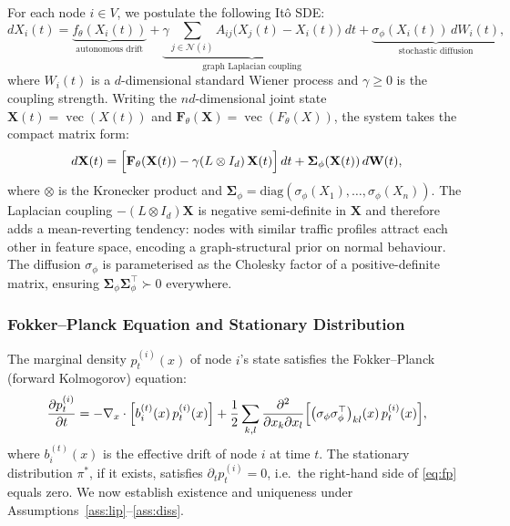 For each node $i \in V$, we postulate the following It\^o SDE:
\begin{equation}\label{eq:sde}
dX_i(t) = \underbrace{f_\theta(X_i(t))}_{\text{autonomous drift}}
         + \underbrace{\gamma \sum_{j \in \mathcal{N}(i)}
           A_{ij}\bigl(X_j(t) - X_i(t)\bigr)}_{\text{graph Laplacian coupling}}\; dt
         + \underbrace{\sigma_\phi(X_i(t))\, dW_i(t)}_{\text{stochastic diffusion}},
\end{equation}
where $W_i(t)$ is a $d$-dimensional standard Wiener process and
$\gamma \ge 0$ is the coupling strength.
Writing the $nd$-dimensional joint state
$\mathbf{X}(t) = \operatorname{vec}(X(t))$ and
$\mathbf{F}_\theta(\mathbf{X}) = \operatorname{vec}(F_\theta(X))$, the system
takes the compact matrix form:
\begin{equation}\label{eq:sde_matrix}
d\mathbf{X}(t)
= \Bigl[\mathbf{F}_\theta(\mathbf{X}(t)) - \gamma(L \otimes I_d)\,\mathbf{X}(t)\Bigr]\,dt
+ \boldsymbol{\Sigma}_\phi(\mathbf{X}(t))\,d\mathbf{W}(t),
\end{equation}
where $\otimes$ is the Kronecker product and
$\boldsymbol{\Sigma}_\phi = \mathrm{diag}(\sigma_\phi(X_1),\ldots,\sigma_\phi(X_n))$.
The Laplacian coupling $-(L\otimes I_d)\mathbf{X}$ is negative semi-definite
in $\mathbf{X}$ and therefore adds a mean-reverting tendency: nodes with
similar traffic profiles attract each other in feature space, encoding a
graph-structural prior on normal behaviour.
The diffusion $\sigma_\phi$ is parameterised as the Cholesky factor of a
positive-definite matrix, ensuring $\boldsymbol{\Sigma}_\phi\boldsymbol{\Sigma}_\phi^\top
\succ 0$ everywhere.

\subsubsection{Fokker--Planck Equation and Stationary Distribution}

The marginal density $p_t^{(i)}(x)$ of node $i$'s state satisfies the
Fokker--Planck (forward Kolmogorov) equation:
\begin{equation}\label{eq:fp}
\frac{\partial p_t^{(i)}}{\partial t}
= -\nabla_x \cdot \Bigl[b_i^{(t)}(x)\, p_t^{(i)}(x)\Bigr]
  + \frac{1}{2}\sum_{k,l}\frac{\partial^2}{\partial x_k \partial x_l}
    \Bigl[\bigl(\sigma_\phi \sigma_\phi^\top\bigr)_{kl}(x)\, p_t^{(i)}(x)\Bigr],
\end{equation}
where $b_i^{(t)}(x)$ is the effective drift of node $i$ at time $t$.
The stationary distribution $\pi^*$, if it exists, satisfies
$\partial_t p_t^{(i)} = 0$, i.e.\ the right-hand side of
\eqref{eq:fp} equals zero.
We now establish existence and uniqueness under
Assumptions~\ref{ass:lip}--\ref{ass:diss}.

